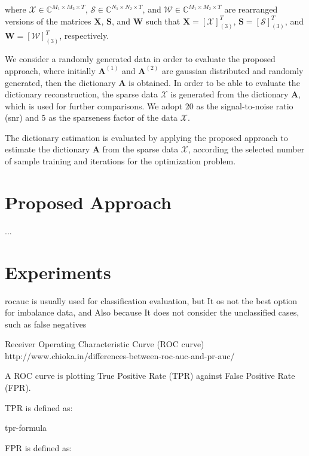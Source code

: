 where $\boldsymbol{\mathcal{X}} \in \mathbb{C}^{M_1 \times M_2 \times T}$, $\boldsymbol{\mathcal{S}} \in \mathbb{C}^{N_1 \times N_2 \times T}$, and $\boldsymbol{\mathcal{W}} \in \mathbb{C}^{M_1 \times M_2 \times T}$ are rearranged versions of the matrices $\boldsymbol{X}$, $\boldsymbol{S}$, and $\boldsymbol{W}$ such that $\boldsymbol{X} = [\boldsymbol{\mathcal{X}}]_{(3)}^T$, $\boldsymbol{S} = [\boldsymbol{\mathcal{S}}]_{(3)}^T$, and $\boldsymbol{W} = [\boldsymbol{\mathcal{W}}]_{(3)}^T$, respectively.

We consider a randomly generated data in order to evaluate the proposed approach, where initially $\boldsymbol{A}^{(1)}$ and $\boldsymbol{A}^{(2)}$ are gaussian distributed and randomly generated, then the dictionary $\boldsymbol{A}$ is obtained. In order to be able to evaluate the dictionary reconstruction, the sparse data $\boldsymbol{\mathcal{X}}$ is generated from the dictionary $\boldsymbol{A}$, which is used for further comparisons. We adopt 20 as the signal-to-noise ratio (snr) and 5 as the sparseness factor of the data $\boldsymbol{\mathcal{X}}$. 

The dictionary estimation is evaluated by applying the proposed approach to estimate the dictionary $\boldsymbol{A}$ from the sparse data $\boldsymbol{\mathcal{X}}$, according the selected number of sample training and iterations for the optimization problem.

\section{Proposed Approach}

...

\section{Experiments}

rocauc is usually used for classification evaluation, but It os not the best option for imbalance data, and Also because It does not consider the unclassified cases, such as false negatives

Receiver Operating Characteristic Curve (ROC curve) http://www.chioka.in/differences-between-roc-auc-and-pr-auc/

A ROC curve is plotting True Positive Rate (TPR) against False Positive Rate (FPR).

TPR is defined as:

tpr-formula

FPR is defined as:


